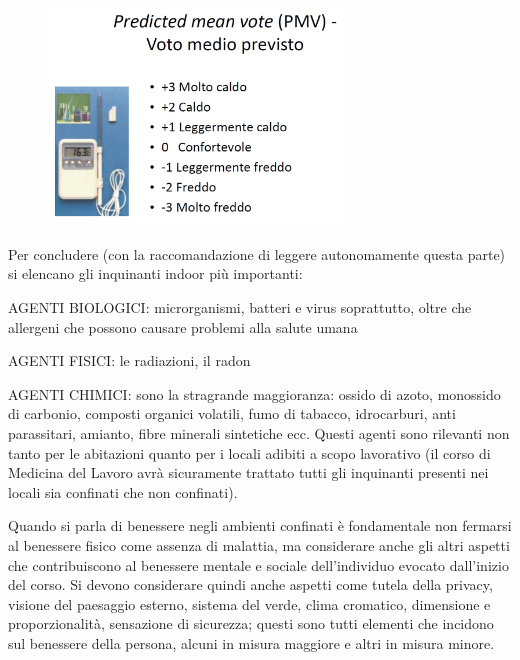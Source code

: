	\begin{figure}[!ht]
	\centering
		\includegraphics[width=0.7\textwidth]{23/image12.jpg}
		\end{figure}

Per concludere (con la raccomandazione di leggere autonomamente questa
parte) si elencano gli inquinanti indoor più importanti:

AGENTI BIOLOGICI: microrganismi, batteri e virus soprattutto, oltre che
allergeni che possono causare problemi alla salute umana

AGENTI FISICI: le radiazioni, il radon

AGENTI CHIMICI: sono la stragrande maggioranza: ossido di azoto,
monossido di carbonio, composti organici volatili, fumo di tabacco,
idrocarburi, anti parassitari, amianto, fibre minerali sintetiche ecc.
Questi agenti sono rilevanti non tanto per le abitazioni quanto per i
locali adibiti a scopo lavorativo (il corso di Medicina del Lavoro avrà
sicuramente trattato tutti gli inquinanti presenti nei locali sia
confinati che non confinati).

Quando si parla di benessere negli ambienti confinati è fondamentale non
fermarsi al benessere fisico come assenza di malattia, ma considerare
anche gli altri aspetti che contribuiscono al benessere mentale e
sociale dell'individuo evocato dall'inizio del corso. Si devono
considerare quindi anche aspetti come tutela della privacy, visione del
paesaggio esterno, sistema del verde, clima cromatico, dimensione e
proporzionalità, sensazione di sicurezza; questi sono tutti elementi che
incidono sul benessere della persona, alcuni in misura maggiore e altri
in misura minore.

